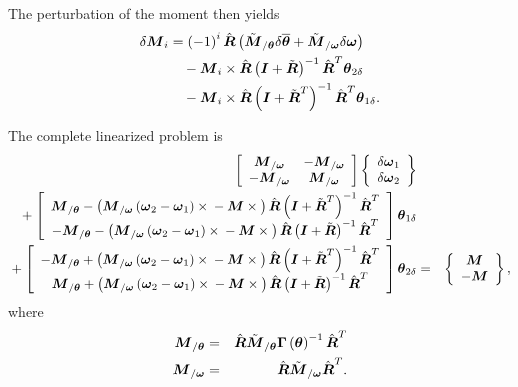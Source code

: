 \documentclass[10pt,dvips,fleqn]{report}
\newcommand{\T}[1]{\boldsymbol{#1}}
\begin{document}
The perturbation of the moment then yields
\begin{align}
	\delta\T{M}_i
	&= \plbr{-1}^i \hat{\T{R}} \plbr{
		\tilde{\T{M}}_{/\T{\theta}} \delta\overline{\T{\theta}}
		+ \tilde{\T{M}}_{/\T{\omega}} \delta\T{\omega}
	} \nonumber \\
	& \mbox{\hspace{10pt}} - \T{M}_i \times \hat{\T{R}}
		\plbr{\T{I} + \tilde{\T{R}}}^{-1} \hat{\T{R}}^T \T{\theta}_{2\delta}
	\nonumber \\
	& \mbox{\hspace{10pt}} - \T{M}_i \times \hat{\T{R}} 
		\plbr{\T{I} + \tilde{\T{R}}^T}^{-1} \hat{\T{R}}^T \T{\theta}_{1\delta} .
\end{align}


The complete linearized problem is
\begin{eqnarray*}
	\sqbr{\matr{cc}{
		\T{M}_{/\T{\omega}} & - \T{M}_{/\T{\omega}} \\
		- \T{M}_{/\T{\omega}} & \T{M}_{/\T{\omega}}
	}}\cubr{\cvvect{
		\delta\T{\omega}_1 \\
		\delta\T{\omega}_2
	}} & & \\
	\mbox{} + \sqbr{\cvvect{
		\T{M}_{/\T{\theta}}
		- \plbr{
			\T{M}_{/\T{\omega}} \plbr{\T{\omega}_2 - \T{\omega}_1} \times{}
			- \T{M}\times{}
		} \hat{\T{R}} \plbr{\T{I} + \tilde{\T{R}}^T}^{-1} \hat{\T{R}}^T \\
		- \T{M}_{/\T{\theta}}
		- \plbr{
			\T{M}_{/\T{\omega}} \plbr{\T{\omega}_2 - \T{\omega}_1} \times{}
			- \T{M}\times{}
		} \hat{\T{R}} \plbr{\T{I} + \tilde{\T{R}}}^{-1} \hat{\T{R}}^T
	}} \T{\theta}_{1\delta} & & \\
	\mbox{} + \sqbr{\cvvect{
		- \T{M}_{/\T{\theta}}
		+ \plbr{
			\T{M}_{/\T{\omega}} \plbr{\T{\omega}_2 - \T{\omega}_1} \times{}
			- \T{M}\times{}
		} \hat{\T{R}} \plbr{\T{I} + \tilde{\T{R}}^T}^{-1} \hat{\T{R}}^T \\
		\T{M}_{/\T{\theta}}
		+ \plbr{
			\T{M}_{/\T{\omega}} \plbr{\T{\omega}_2 - \T{\omega}_1} \times{}
			- \T{M}\times{}
		} \hat{\T{R}} \plbr{\T{I} + \tilde{\T{R}}}^{-1} \hat{\T{R}}^T
	}} \T{\theta}_{2\delta} 
	& = & \cubr{\cvvect{
		\T{M} \\
		- \T{M}
	}} ,
\end{eqnarray*}
where
\begin{eqnarray*}
	\T{M}_{/\T{\theta}} & = & \hat{\T{R}} \tilde{\T{M}}_{/\T{\theta}} \T{\Gamma}\plbr{\T{\theta}}^{-1} \hat{\T{R}}^T \\
	\T{M}_{/\T{\omega}} & = & \hat{\T{R}} \tilde{\T{M}}_{/\T{\omega}} \hat{\T{R}}^T .
\end{eqnarray*}
\end{document}

